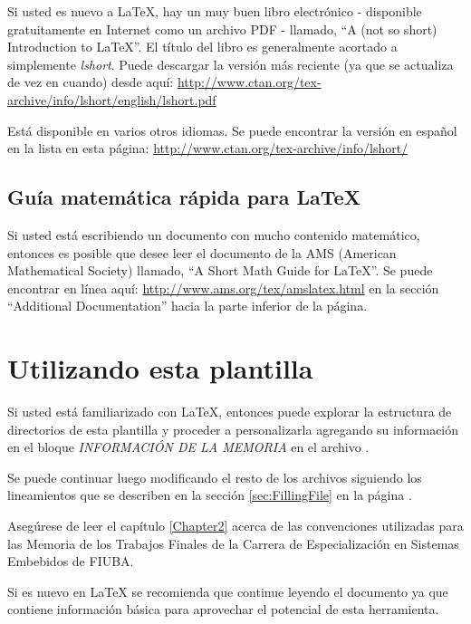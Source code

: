 Si usted es nuevo a \LaTeX{}, hay un muy buen libro electrónico - disponible gratuitamente en Internet como un archivo PDF - llamado, \enquote{A (not so short) Introduction to \LaTeX{}}. El título del libro es generalmente acortado a simplemente \emph{lshort}. Puede descargar la versión más reciente (ya que se actualiza de vez en cuando) desde aquí:
\url{http://www.ctan.org/tex-archive/info/lshort/english/lshort.pdf}

Está disponible en varios otros idiomas. Se puede encontrar la versión en español en la lista en esta página: \url{http://www.ctan.org/tex-archive/info/lshort/}


\subsection{Guía matemática rápida para \LaTeX{}}

Si usted está escribiendo un documento con mucho contenido matemático, entonces es posible que desee leer el documento de la AMS (American Mathematical Society) llamado, \enquote{A Short Math Guide for \LaTeX{}}. Se puede encontrar en línea aquí: \url{http://www.ams.org/tex/amslatex.html} en la sección \enquote{Additional Documentation} hacia la parte inferior de la página.



\section{Utilizando esta plantilla}

Si usted está familiarizado con \LaTeX{}, entonces puede explorar la estructura de directorios de esta plantilla y proceder a personalizarla agregando su información en el bloque \emph{INFORMACIÓN DE LA MEMORIA} en el archivo .  

Se puede continuar luego modificando el resto de los archivos siguiendo los lineamientos que se describen en la sección \ref{sec:FillingFile} en la página \pageref{FillingFile}.

Asegúrese de leer el capítulo \ref{Chapter2} acerca de las convenciones utilizadas para las Memoria de los Trabajos Finales de la Carrera de Especialización en Sistemas Embebidos de FIUBA.

Si es nuevo en \LaTeX{} se recomienda que continue leyendo el documento ya que contiene información básica para aprovechar el potencial de esta herramienta.


